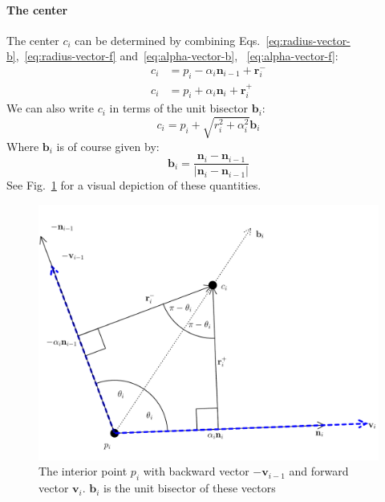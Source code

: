 \documentclass{article}
\begin{document}
\paragraph{The center}
%
The center $c_{i}$ can be determined by combining Eqs.~\eqref{eq:radius-vector-b},~\eqref{eq:radius-vector-f} and~\eqref{eq:alpha-vector-b}, ~\eqref{eq:alpha-vector-f}:
%
\begin{align}
  \label{eq:center-vector-b}
  c_{i} &= p_{i} - \alpha_i\mathbf{n}_{i-1} + \mathbf{r}^{-}_{i}\\
  \label{eq:center-vector-f}
  c_{i} &= p_{i} + \alpha_i\mathbf{n}_i + \mathbf{r}^{+}_{i}
\end{align}
%
We can also write $c_{i}$ in terms of the unit bisector $\mathbf{b}_{i}$:
%
\begin{equation}
  \label{eq:center-bisector}
  c_{i} = p_{i} + \sqrt{r_{i}^{2} + \alpha_{i}^{2}}\mathbf{b}_{i}
\end{equation}
%
Where $\mathbf{b}_i$ is of course given by:
%
\begin{equation}
  \label{eq:bisector}
  \mathbf{b}_i = \frac{\mathbf{n}_i-\mathbf{n}_{i-1}}{\left|\mathbf{n}_i-\mathbf{n}_{i-1}\right|}
\end{equation}
%
See Fig.~\ref{fig:interior-point} for a visual depiction of these quantities.
%
\begin{figure}[h]
  \centering
  \includegraphics[width=\columnwidth]{4}
  \caption{The interior point $p_{i}$ with backward vector $-\mathbf{v}_{i-1}$ and forward vector $\mathbf{v}_{i}$. $\mathbf{b}_{i}$ is the unit bisector of these vectors}
  \label{fig:interior-point}
\end{figure}
\end{document}
